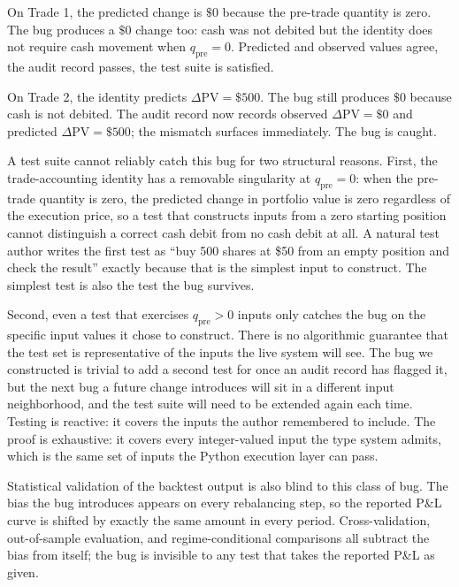 \documentclass[
  11pt,
  letterpaper,
  DIV=12,
  numbers=noendperiod]{scrartcl}
\numberwithin{equation}{section}
\numberwithin{figure}{section}
\numberwithin{table}{section}
\begin{document}
On Trade 1, the predicted change is \(\$0\) because the pre-trade
quantity is zero. The bug produces a \(\$0\) change too: cash was not
debited but the identity does not require cash movement when
\(q_{\text{pre}}=0\). Predicted and observed values agree, the audit
record passes, the test suite is satisfied.

On Trade 2, the identity predicts \(\Delta\text{PV} = \$500\). The bug
still produces \(\$0\) because cash is not debited. The audit record now
records observed \(\Delta\text{PV} = \$0\) and predicted
\(\Delta\text{PV}
= \$500\); the mismatch surfaces immediately. The bug is caught.

A test suite cannot reliably catch this bug for two structural reasons.
First, the trade-accounting identity has a removable singularity at
\(q_{\text{pre}}=0\): when the pre-trade quantity is zero, the predicted
change in portfolio value is zero regardless of the execution price, so
a test that constructs inputs from a zero starting position cannot
distinguish a correct cash debit from no cash debit at all. A natural
test author writes the first test as ``buy 500 shares at \$50 from an
empty position and check the result'' exactly because that is the
simplest input to construct. The simplest test is also the test the bug
survives.

Second, even a test that exercises \(q_{\text{pre}}>0\) inputs only
catches the bug on the specific input values it chose to construct.
There is no algorithmic guarantee that the test set is representative of
the inputs the live system will see. The bug we constructed is trivial
to add a second test for once an audit record has flagged it, but the
next bug a future change introduces will sit in a different input
neighborhood, and the test suite will need to be extended again each
time. Testing is reactive: it covers the inputs the author remembered to
include. The proof is exhaustive: it covers every integer-valued input
the type system admits, which is the same set of inputs the Python
execution layer can pass.

Statistical validation of the backtest output is also blind to this
class of bug. The bias the bug introduces appears on every rebalancing
step, so the reported P\&L curve is shifted by exactly the same amount
in every period. Cross-validation, out-of-sample evaluation, and
regime-conditional comparisons all subtract the bias from itself; the
bug is invisible to any test that takes the reported P\&L as given.
\end{document}
